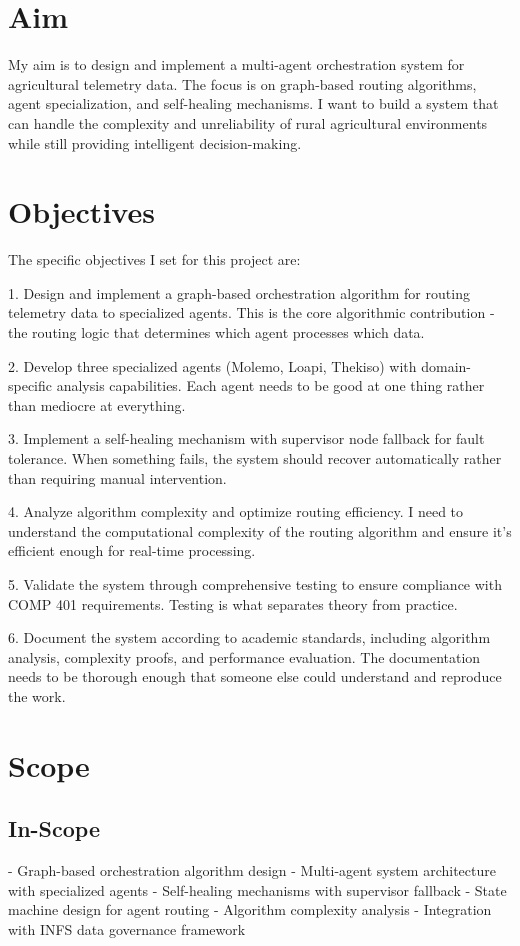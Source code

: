 \section{Aim}

My aim is to design and implement a multi-agent orchestration system for agricultural telemetry data. The focus is on graph-based routing algorithms, agent specialization, and self-healing mechanisms. I want to build a system that can handle the complexity and unreliability of rural agricultural environments while still providing intelligent decision-making.

\section{Objectives}

The specific objectives I set for this project are:

1. Design and implement a graph-based orchestration algorithm for routing telemetry data to specialized agents. This is the core algorithmic contribution - the routing logic that determines which agent processes which data.

2. Develop three specialized agents (Molemo, Loapi, Thekiso) with domain-specific analysis capabilities. Each agent needs to be good at one thing rather than mediocre at everything.

3. Implement a self-healing mechanism with supervisor node fallback for fault tolerance. When something fails, the system should recover automatically rather than requiring manual intervention.

4. Analyze algorithm complexity and optimize routing efficiency. I need to understand the computational complexity of the routing algorithm and ensure it's efficient enough for real-time processing.

5. Validate the system through comprehensive testing to ensure compliance with COMP 401 requirements. Testing is what separates theory from practice.

6. Document the system according to academic standards, including algorithm analysis, complexity proofs, and performance evaluation. The documentation needs to be thorough enough that someone else could understand and reproduce the work.

\section{Scope}

\subsection{In-Scope}
- Graph-based orchestration algorithm design
- Multi-agent system architecture with specialized agents
- Self-healing mechanisms with supervisor fallback
- State machine design for agent routing
- Algorithm complexity analysis
- Integration with INFS data governance framework

